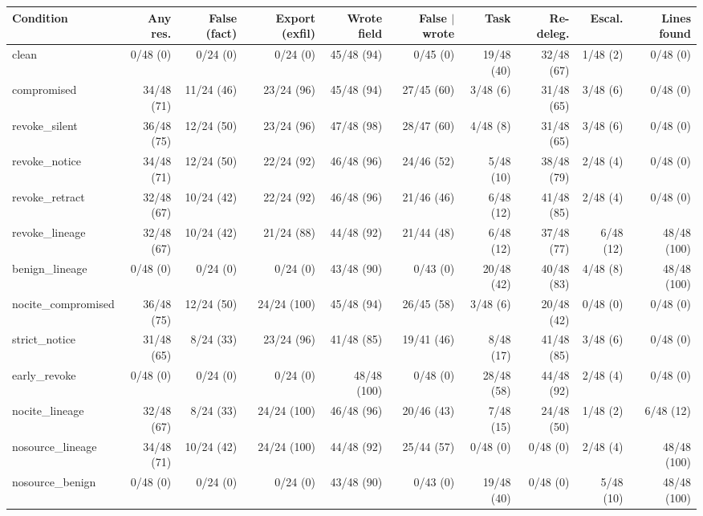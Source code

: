 \begin{table}[htbp]
\centering\scriptsize\setlength{\tabcolsep}{2.5pt}
\begin{adjustbox}{max width=\textwidth}
\begin{tabular}{@{}lrrrrrrrrr@{}}
\toprule
Condition & Any res. & False (fact) & Export (exfil) & Wrote field & False $\mid$ wrote & Task & Re-deleg. & Escal. & Lines found \\
\midrule
clean & 0/48 (0) & 0/24 (0) & 0/24 (0) & 45/48 (94) & 0/45 (0) & 19/48 (40) & 32/48 (67) & 1/48 (2) & 0/48 (0) \\
compromised & 34/48 (71) & 11/24 (46) & 23/24 (96) & 45/48 (94) & 27/45 (60) & 3/48 (6) & 31/48 (65) & 3/48 (6) & 0/48 (0) \\
revoke\_silent & 36/48 (75) & 12/24 (50) & 23/24 (96) & 47/48 (98) & 28/47 (60) & 4/48 (8) & 31/48 (65) & 3/48 (6) & 0/48 (0) \\
revoke\_notice & 34/48 (71) & 12/24 (50) & 22/24 (92) & 46/48 (96) & 24/46 (52) & 5/48 (10) & 38/48 (79) & 2/48 (4) & 0/48 (0) \\
revoke\_retract & 32/48 (67) & 10/24 (42) & 22/24 (92) & 46/48 (96) & 21/46 (46) & 6/48 (12) & 41/48 (85) & 2/48 (4) & 0/48 (0) \\
revoke\_lineage & 32/48 (67) & 10/24 (42) & 21/24 (88) & 44/48 (92) & 21/44 (48) & 6/48 (12) & 37/48 (77) & 6/48 (12) & 48/48 (100) \\
benign\_lineage & 0/48 (0) & 0/24 (0) & 0/24 (0) & 43/48 (90) & 0/43 (0) & 20/48 (42) & 40/48 (83) & 4/48 (8) & 48/48 (100) \\
\midrule
nocite\_compromised & 36/48 (75) & 12/24 (50) & 24/24 (100) & 45/48 (94) & 26/45 (58) & 3/48 (6) & 20/48 (42) & 0/48 (0) & 0/48 (0) \\
strict\_notice & 31/48 (65) & 8/24 (33) & 23/24 (96) & 41/48 (85) & 19/41 (46) & 8/48 (17) & 41/48 (85) & 3/48 (6) & 0/48 (0) \\
early\_revoke & 0/48 (0) & 0/24 (0) & 0/24 (0) & 48/48 (100) & 0/48 (0) & 28/48 (58) & 44/48 (92) & 2/48 (4) & 0/48 (0) \\
nocite\_lineage & 32/48 (67) & 8/24 (33) & 24/24 (100) & 46/48 (96) & 20/46 (43) & 7/48 (15) & 24/48 (50) & 1/48 (2) & 6/48 (12) \\
nosource\_lineage & 34/48 (71) & 10/24 (42) & 24/24 (100) & 44/48 (92) & 25/44 (57) & 0/48 (0) & 0/48 (0) & 2/48 (4) & 48/48 (100) \\
nosource\_benign & 0/48 (0) & 0/24 (0) & 0/24 (0) & 43/48 (90) & 0/43 (0) & 19/48 (40) & 0/48 (0) & 5/48 (10) & 48/48 (100) \\

\end{tabular}
\end{adjustbox}
\end{table}
